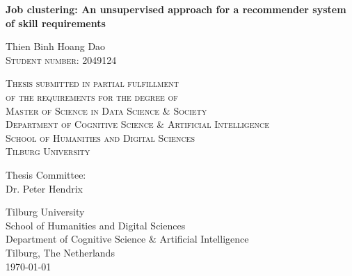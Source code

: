 \documentclass[a4paper,man,floatsintext,natbib,noextraspace]{apa6}
\begin{document}

\thispagestyle{empty}
\begin{titlepage}
    \begin{center}
        \vspace*{2.5cm}
            
        \Huge
        \textbf{Job clustering: An unsupervised approach for a recommender system of skill requirements} \\
            
        \vspace{1cm}
        
        \normalsize
        Thien Binh Hoang Dao \\
        \textsc{Student number:} 2049124
        
        \vspace{1cm}
        
        \normalsize    
        \textsc{Thesis submitted in partial fulfillment \\
        of the requirements for the degree of \\
        Master of Science in Data Science \& Society \\
        Department of Cognitive Science \& Artificial Intelligence \\
        School of Humanities and Digital Sciences \\
        Tilburg University 
        }
        
         \vspace{1cm}
          
        Thesis Committee: \\
        Dr. Peter Hendrix
        \vfill
            
        \vspace{0.5cm}
        
        \normalsize    
        Tilburg University \\
        School of Humanities and Digital Sciences \\
        Department of Cognitive Science \& Artificial Intelligence \\
        Tilburg, The Netherlands \\
        \today
            
    \end{center}
\end{titlepage}

\tableofcontents
\end{document}
